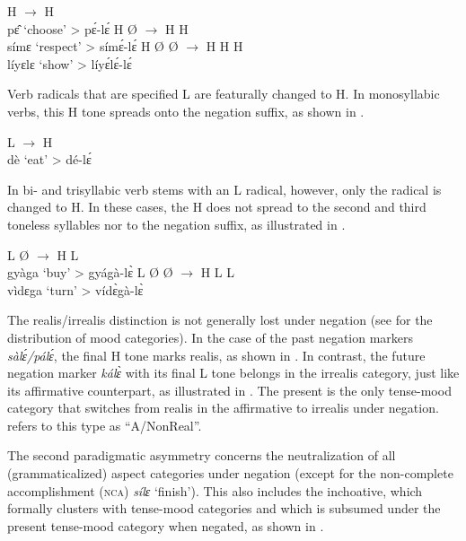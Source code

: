 \documentclass[output=paper,colorlinks=true, citecolor=brown,draftmode]{langscibook}
\begin{document}
\begin{exe} \ex\label{leH}
\begin{xlist}
\ex\label{leHL} H $\rightarrow$ H \\
 pɛ̂ `choose' > pɛ́-lɛ́
\ex\label{leHLbi} H {\O} $\rightarrow$ H H \\
 símɛ  `respect' > símɛ́-lɛ́
\ex\label{leHLL} H {\O} {\O} $\rightarrow$ H H H   \\
líyɛlɛ  `show' > líyɛ́lɛ́-lɛ́
\end{xlist}
\end{exe}

Verb radicals that are specified L are featurally changed to H. In monosyllabic verbs, this H tone spreads onto the negation suffix, as shown in .

\begin{exe}
\ex\label{leL} L $\rightarrow$ H \\
dè `eat' > dé-lɛ́
\end{exe}

In bi- and trisyllabic verb stems with an L radical, however, only the radical is changed to H. In these cases, the H does not spread to the second and third toneless syllables nor to the negation suffix, as illustrated in .

\begin{exe} \ex\label{leL2}
\begin{xlist}
\ex\label{leLL} L {\O} $\rightarrow$ H L \\
gyàga `buy' > gyágà-lɛ̀
\ex\label{leLLL} L {\O} {\O} $\rightarrow$ H L L \\
vìdɛga  `turn' > vídɛ̀gà-lɛ̀
\end{xlist}
\end{exe}

The realis/irrealis distinction is not generally lost under negation (see  for the distribution of mood categories). In the case of the past negation markers {\itshape  sàlɛ́/pálɛ́}, the final H tone marks realis, as shown in . In contrast, the future negation marker {\itshape kálɛ̀} with its final L tone belongs in the irrealis category, just like its affirmative counterpart, as illustrated in . The present is the only tense-mood category that switches from realis in the affirmative to irrealis under negation.  \citet{Miestamo2007} refers to this type as ``A/NonReal''. 

The second paradigmatic asymmetry concerns the neutralization of all (grammaticalized) aspect categories under negation (except for the non-complete accomplishment (\textsc{nca}) {\itshape sílɛ} `finish'). This also includes the inchoative, which formally clusters with tense-mood categories and which is subsumed under the present tense-mood category when negated, as shown in .
\end{document}
